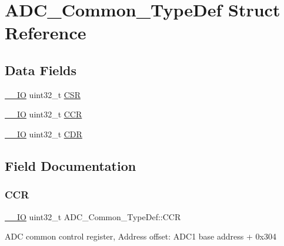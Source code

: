 \hypertarget{struct_a_d_c___common___type_def}{}\section{A\+D\+C\+\_\+\+Common\+\_\+\+Type\+Def Struct Reference}
\label{struct_a_d_c___common___type_def}
\subsection*{Data Fields}
\begin{DoxyCompactItemize}
\item 
\hyperlink{core__sc300_8h_aec43007d9998a0a0e01faede4133d6be}{\+\_\+\+\_\+\+IO} uint32\+\_\+t \hyperlink{struct_a_d_c___common___type_def_ac38e24f600f9e134a54a0c43b976a4f4}{C\+SR}
\item 
\hyperlink{core__sc300_8h_aec43007d9998a0a0e01faede4133d6be}{\+\_\+\+\_\+\+IO} uint32\+\_\+t \hyperlink{struct_a_d_c___common___type_def_aee6d4af7571a1bad2fec9e7b53733277}{C\+CR}
\item 
\hyperlink{core__sc300_8h_aec43007d9998a0a0e01faede4133d6be}{\+\_\+\+\_\+\+IO} uint32\+\_\+t \hyperlink{struct_a_d_c___common___type_def_a6f7399bf70f677ef5de46a3038f414e1}{C\+DR}
\end{DoxyCompactItemize}


\subsection{Field Documentation}
\mbox{\label{struct_a_d_c___common___type_def_aee6d4af7571a1bad2fec9e7b53733277}} 
\subsubsection{\texorpdfstring{C\+CR}{CCR}}
{\footnotesize\ttfamily \hyperlink{core__sc300_8h_aec43007d9998a0a0e01faede4133d6be}{\+\_\+\+\_\+\+IO} uint32\+\_\+t A\+D\+C\+\_\+\+Common\+\_\+\+Type\+Def\+::\+C\+CR}

A\+DC common control register, Address offset\+: A\+D\+C1 base address + 0x304 \mbox{\label{struct_a_d_c___common___type_def_a6f7399bf70f677ef5de46a3038f414e1}} 
